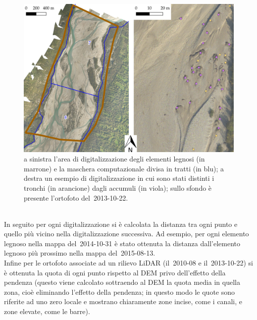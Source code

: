 \begin{figure}
	\centering
	\includegraphics[width = \textwidth]{files/digitalizzazione_legno.jpeg}
	\caption[area di digitalizzazione degli elementi legnosi]{a sinistra l'area di digitalizzazione degli elementi legnosi (in marrone) e la maschera computazionale divisa in tratti (in blu); a destra un esempio di digitalizzazione in cui sono stati distinti i tronchi (in arancione) dagli accumuli (in viola); sullo sfondo è presente l'ortofoto del~2013-10-22.}
	\label{fig:digitalizzazione-legno}
\end{figure}
%
\\
In seguito per ogni digitalizzazione si è calcolata la distanza tra ogni punto e quello più vicino nella digitalizzazione successiva. Ad esempio, per ogni elemento legnoso nella mappa del~2014-10-31 è stato ottenuta la distanza dall'elemento legnoso più prossimo nella mappa del~2015-08-13.
\\
Infine per le ortofoto associate ad un rilievo LiDAR (il~2010-08 e il~2013-10-22) si è ottenuta la quota di ogni punto rispetto al DEM privo dell'effetto della pendenza (questo viene calcolato sottraendo al DEM la quota media in quella zona, cioè eliminando l'effetto della pendenza; in questo modo le quote sono riferite ad uno zero locale e mostrano chiaramente zone incise, come i canali, e zone elevate, come le barre).
